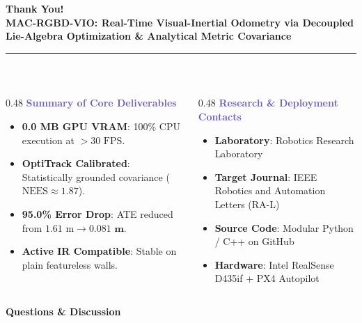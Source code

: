 \documentclass[aspectratio=169, 10pt]{beamer}
\begin{document}
\begin{frame}[plain]
  \vspace{0.8cm}
  \begin{center}
    {\LARGE \textbf{\textcolor{NavyBlue}{Thank You!}}}\\[0.35cm]
    {\large \textbf{MAC-RGBD-VIO: Real-Time Visual-Inertial Odometry via Decoupled Lie-Algebra Optimization \& Analytical Metric Covariance}}\\[0.45cm]
    {\color{LightLine}\rule{0.6\linewidth}{0.8pt}}\\[0.45cm]

    \begin{columns}[T]
      \begin{column}{0.48\textwidth}
        \centering
        {\small \textbf{\textcolor{SlateBlue}{Summary of Core Deliverables}}}
        \vspace{0.15cm}
        \scriptsize
        \begin{itemize}
          \setlength{\itemsep}{2pt}
          \item \textbf{0.0 MB GPU VRAM}: 100\% CPU execution at $>30\text{ FPS}$.
          \item \textbf{OptiTrack Calibrated}: Statistically grounded covariance ($\text{NEES} \approx 1.87$).
          \item \textbf{95.0\% Error Drop}: ATE reduced from $1.61\text{ m} \rightarrow \mathbf{0.081\text{ m}}$.
          \item \textbf{Active IR Compatible}: Stable on plain featureless walls.
        \end{itemize}
      \end{column}

      \begin{column}{0.48\textwidth}
        \centering
        {\small \textbf{\textcolor{SlateBlue}{Research \& Deployment Contacts}}}
        \vspace{0.15cm}
        \scriptsize
        \begin{itemize}
          \setlength{\itemsep}{2pt}
          \item \textbf{Laboratory}: Robotics Research Laboratory
          \item \textbf{Target Journal}: IEEE Robotics and Automation Letters (RA-L)
          \item \textbf{Source Code}: Modular Python / C++ on GitHub
          \item \textbf{Hardware}: Intel RealSense D435if + PX4 Autopilot
        \end{itemize}
      \end{column}
    \end{columns}

    \vspace{0.6cm}
    {\large \textcolor{NavyBlue}{\textbf{Questions \& Discussion}}}
  \end{center}
\end{frame}
\end{document}
